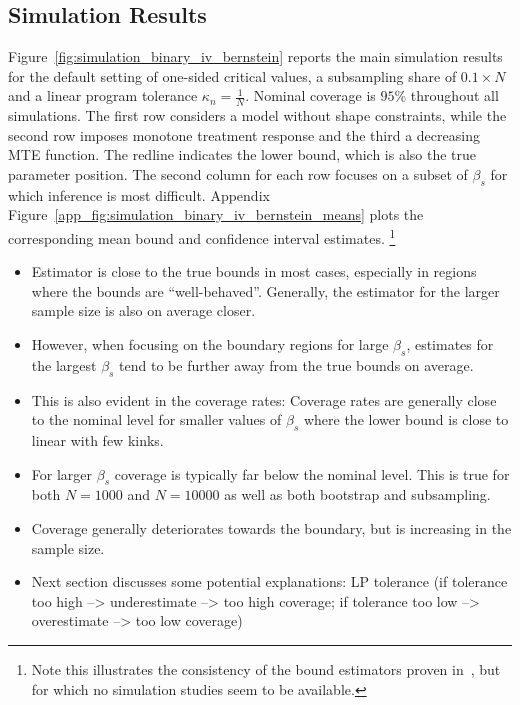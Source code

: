 \documentclass[12pt,a4paper,english]{article} %
\numberwithin{equation}{section}
\theoremstyle{definition}
\theoremstyle{remark}
\theoremstyle{plain}
\begin{document}
\subsection{Simulation Results}
Figure~\ref{fig:simulation_binary_iv_bernstein} reports the main simulation results for the default setting of one-sided critical values,  a subsampling share of $0.1\times N$ and a linear program tolerance $\kappa_n = \frac{1}{N}$.
Nominal coverage is $95$\% throughout all simulations. The first row considers a model without shape constraints, while the second row imposes monotone treatment response and the third a decreasing MTE function.
The redline indicates the lower bound, which is also the true parameter position.
The second column for each row focuses on a subset of $\beta_s$ for which inference is most difficult.
Appendix Figure~\ref{app_fig:simulation_binary_iv_bernstein_means} plots the corresponding mean bound and confidence interval estimates.
\footnote{Note this illustrates the consistency of the bound estimators proven in~\cite{mogstad2018using}, but for which no simulation studies seem to be available.}

\begin{itemize}
  \item Estimator is close to the true bounds in most cases, especially in regions where the bounds are ``well-behaved''. Generally, the estimator for the larger sample size is also on average closer.
  \item However, when focusing on the boundary regions for large $\beta_s$, estimates for the largest $\beta_s$ tend to be further away from the true bounds on average.
  \item This is also evident in the coverage rates: Coverage rates are generally close to the nominal level for smaller values of $\beta_s$ where the lower bound is close to linear with few kinks.
  \item For larger $\beta_s$ coverage is typically far below the nominal level. This is true for both $N=1000$ and $N=10000$ as well as both bootstrap and subsampling.
  \item Coverage generally deteriorates towards the boundary, but is increasing in the sample size.
  \item Next section discusses some potential explanations: LP tolerance (if tolerance too high --> underestimate --> too high coverage; if tolerance too low --> overestimate --> too low coverage)
\end{itemize}
\end{document}
